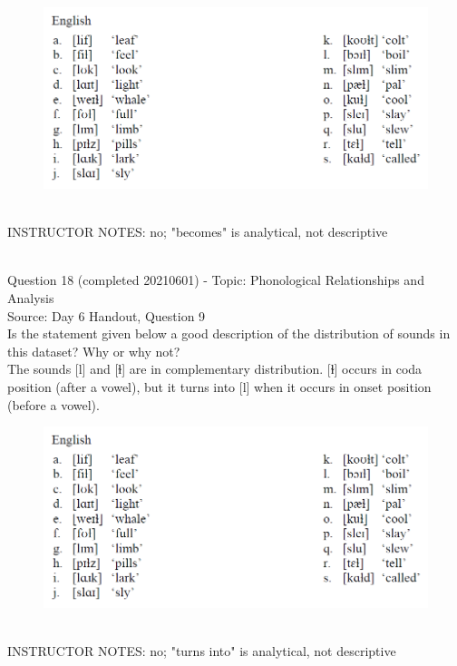 \documentclass[12pt]{article}
\begin{document}
\begin{figure}[H]
\includegraphics{../images/english_laterals.png}
\end{figure}

~\\
INSTRUCTOR NOTES: no; "becomes" is analytical, not descriptive


~\\

{\large Question 18} (completed 20210601) - Topic: Phonological Relationships and Analysis\\
Source: Day 6 Handout, Question 9\\

Is the statement given below a good description of the distribution of sounds in this dataset? Why or why not?\\

The sounds {[l]} and {[ɫ]} are in complementary distribution. {[ɫ]} occurs in coda position (after a vowel), but it turns into {[l]} when it occurs in onset position (before a vowel).

\begin{figure}[H]
\includegraphics{../images/english_laterals.png}
\end{figure}

~\\
INSTRUCTOR NOTES: no; "turns into" is analytical, not descriptive
\end{document}
